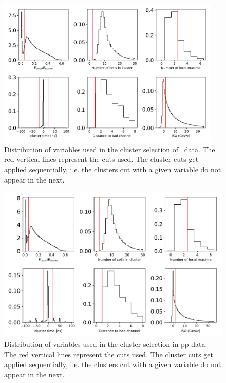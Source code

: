 \begin{figure}[h]
\center
\includegraphics[width=0.95\textwidth]{Data_Analysis/EventAndClusterSelection/ClusterCutFlow_dataset_Skimmed_13def}
\caption{Distribution of variables used in the cluster selection of \pPb~data. The red vertical lines represent the cuts used. The cluster cuts get applied sequentially, i.e. the clusters cut with a given variable do not appear in the next.}
\label{ClusterCutFlow_pPb}
\end{figure}


\begin{figure}[h]
\center
\includegraphics[width=.95\textwidth]{Data_Analysis/EventAndClusterSelection/ClusterCutFlow_dataset_Skimmed_17q}
\caption{Distribution of variables used in the cluster selection in pp data. The red vertical lines represent the cuts used. The cluster cuts get applied sequentially, i.e. the clusters cut with a given variable do not appear in the next.}
\label{ClusterCutFlow_pp}
\end{figure}



